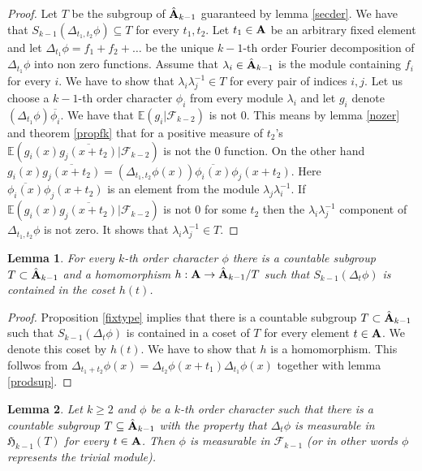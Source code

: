 \documentclass [11pt] {article}
\newtheorem{lemma}{Lemma}[section]
\def\bA{{\bf A}}
\begin{document}
\begin{proof}  Let $T$ be the subgroup of $\hat{\bA}_{k-1}$ guaranteed by lemma \ref{secder}. We have that $S_{k-1}(\Delta_{t_1,t_2}\phi)\subseteq T$ for every $t_1,t_2$. Let $t_1\in\bA$ be an arbitrary fixed element and let $\Delta_{t_1}\phi=f_1+f_2+\dots$ be the unique $k-1$-th order Fourier decomposition of $\Delta_{t_1}\phi$ into non zero functions. Assume that $\lambda_i\in\hat{\bA}_{k-1}$ is the module containing $f_i$ for every $i$. We have to show that $\lambda_i\lambda_j^{-1}\in T$ for every pair of indices $i,j$.
Let us choose a $k-1$-th order character $\phi_i$ from every module $\lambda_i$ and let $g_i$ denote $(\Delta_{t_1}\phi)\overline{\phi_i}$.
We have that $\mathbb{E}(g_i|\mathcal{F}_{k-2})$ is not $0$.
This means by lemma \ref{nozer} and theorem \ref{propfk} that for a positive measure of $t_2$'s $\mathbb{E}(g_i(x)\overline{g_j(x+t_2)}|\mathcal{F}_{k-2})$ is not the $0$ function. On the other hand $g_i(x)\overline{g_j(x+t_2)}=(\Delta_{t_1,t_2}\phi(x))\overline{\phi_i(x)}\phi_j(x+t_2)$.
Here $\overline{\phi_i(x)}\phi_j(x+t_2)$ is an element from the module $\lambda_j\lambda_i^{-1}$.
If $\mathbb{E}(g_i(x)\overline{g_j(x+t_2)}|\mathcal{F}_{k-2})$ is not $0$ for some $t_2$ then the $\lambda_i\lambda_j^{-1}$ component of $\Delta_{t_1,t_2}\phi$ is not zero. It shows that $\lambda_i\lambda_j^{-1}\in T$.
\end{proof}


\begin{lemma}\label{charhom} For every $k$-th order character $\phi$ there is a countable subgroup $T\subset\hat{\bA}_{k-1}$ and a homomorphism $h:\bA\rightarrow\hat{\bA}_{k-1}/T$ such that $S_{k-1}(\Delta_t\phi)$ is contained in the coset $h(t)$.
\end{lemma}

\begin{proof} Proposition \ref{fixtype} implies that there is a countable subgroup $T\subset\hat{\bA}_{k-1}$ such that $S_{k-1}(\Delta_t\phi)$ is contained in a coset of $T$ for every element $t\in\bA$. We denote this coset by $h(t)$. We have to show that $h$ is a homomorphism. This follwos from 
$\Delta_{t_1+t_2}\phi(x)=\Delta_{t_2}\phi(x+t_1)\Delta_{t_1}\phi(x)$
together with lemma \ref{prodsup}.
\end{proof}

\begin{lemma}\label{countriv} Let $k\geq 2$ and $\phi$ be a $k$-th order character such that there is a countable subgroup $T\subseteq \hat{\bA}_{k-1}$ with the property that $\Delta_t\phi$ is measurable in $\mathfrak{H}_{k-1}(T)$ for every $t\in\bA$. Then $\phi$ is measurable in $\mathcal{F}_{k-1}$ (or in other words $\phi$ represents the trivial module).
\end{lemma}
\end{document}
